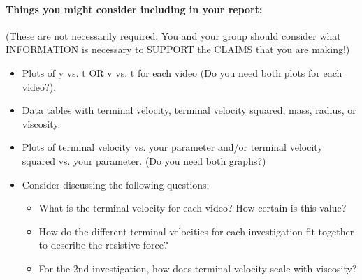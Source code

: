 \paragraph{Things you might consider including in your report:}
(These are not necessarily required. You and your group should consider what INFORMATION is necessary to SUPPORT the CLAIMS that you are making!)
\begin{itemize}
\item Plots of y vs. t OR v vs. t for each video (Do you need both plots for each video?).
\item Data tables with terminal velocity, terminal velocity squared, mass, radius, or viscosity.
\item Plots of terminal velocity vs. your parameter and/or terminal velocity squared vs. your parameter. (Do you need both graphs?)
\item Consider discussing the following questions:
	\begin{itemize}
	\item What is the terminal velocity for each video? How certain is this value?
	\item How do the different terminal velocities for each investigation fit together to describe the resistive force?
	\item For the 2nd investigation, how does terminal velocity scale with viscosity?
	\end{itemize}
\end{itemize}

